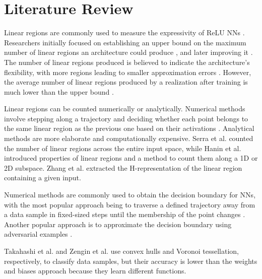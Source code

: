 \documentclass{article}
\begin{document}
\section{Literature Review}

Linear regions are commonly used to measure the expressivity of ReLU NNs \cite{gamba2022all}. Researchers initially focused on establishing an upper bound on the maximum number of linear regions an architecture could produce \cite{montufar2014number}, and later improving it \cite{raghu2017expressive, serra2018bounding}. The number of linear regions produced is believed to indicate the architecture's flexibility, with more regions leading to smaller approximation errors \cite{liu2021optimal}. However, the average number of linear regions produced by a realization after training is much lower than the upper bound \cite{serra2018bounding}.

Linear regions can be counted numerically or analytically. Numerical methods involve stepping along a trajectory and deciding whether each point belongs to the same linear region as the previous one based on their activations \cite{novak2018sensitivity, raghu2017expressive}. Analytical methods are more elaborate and computationally expensive. Serra et al. \cite{serra2018bounding} counted the number of linear regions across the entire input space, while Hanin et al. \cite{hanin2019deep, hanin2019complexity} introduced properties of linear regions and a method to count them along a 1D or 2D subspace. Zhang et al. \cite{zhang2020empirical} extracted the H-representation of the linear region containing a given input.

Numerical methods are commonly used to obtain the decision boundary for NNs, with the most popular approach being to traverse a defined trajectory away from a data sample in fixed-sized steps until the membership of the point changes \cite{zhang2020empirical, he2018decision, ortiz2020hold, guan2020analysis, karimi2020decision}. Another popular approach is to approximate the decision boundary using adversarial examples \cite{ortiz2020hold, guan2020analysis, karimi2020decision}.

Takahashi et al. \cite{takahashi2011construction} and Zengin et al. \cite{zengin2022super} use convex hulls and Voronoi tessellation, respectively, to classify data samples, but their accuracy is lower than the weights and biases approach because they learn different functions.
\end{document}
